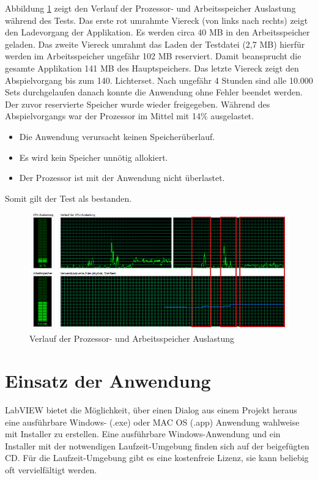 Abbildung \ref{fig:test} zeigt den Verlauf der Prozessor- und Arbeitsspeicher Auslastung während des Tests. 
Das erste rot umrahmte Viereck (von links nach rechts) zeigt den Ladevorgang der Applikation. Es werden circa 40 MB in den Arbeitsspeicher geladen. 
Das zweite Viereck umrahmt das Laden der Testdatei (2,7 MB) hierfür werden im Arbeitsspeicher ungefähr 102 MB reserviert. 
Damit beansprucht die gesamte Applikation 141 MB des Hauptspeichers. 
Das letzte Viereck zeigt  den Abspielvorgang bis zum 140. Lichterset. 
Nach ungefähr 4 Stunden sind alle 10.000 Sets durchgelaufen danach konnte die Anwendung ohne Fehler beendet werden.
Der zuvor reservierte Speicher wurde wieder freigegeben. 
Während des Abspielvorgangs war der Prozessor im Mittel mit 14\% ausgelastet.


\begin{itemize}
\item Die Anwendung verursacht keinen Speicherüberlauf.
\item Es wird kein Speicher unnötig allokiert.
\item Der Prozessor ist mit der Anwendung nicht überlastet.
\end{itemize}
 Somit gilt der Test als bestanden. 

	\begin{figure}%
	\centering
		\includegraphics[width=\textwidth]{Pics/test04.png}
	\caption{Verlauf der Prozessor- und Arbeitsspeicher Auslastung}
	\label{fig:test}
	\end{figure}




\section{Einsatz der Anwendung}
LabVIEW bietet die Möglichkeit, über einen Dialog aus einem Projekt heraus eine ausführbare Windows- (.exe) oder MAC OS (.app) Anwendung wahlweise mit Installer zu erstellen. 
Eine ausführbare Windows-Anwendung und ein Installer mit der notwendigen Laufzeit-Umgebung finden sich auf der beigefügten CD. 
Für die Laufzeit-Umgebung gibt es eine kostenfreie Lizenz, sie kann beliebig oft vervielfältigt werden.

